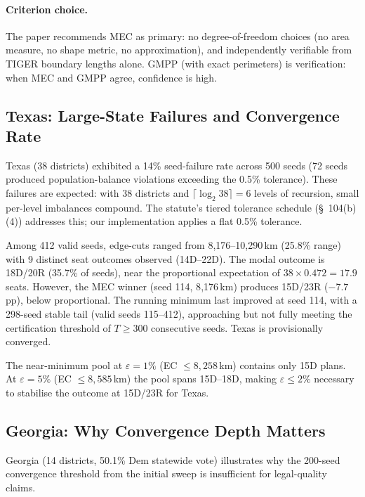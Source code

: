 \paragraph{Criterion choice.}
The paper recommends MEC as primary: no degree-of-freedom choices (no area
measure, no shape metric, no approximation), and independently verifiable
from TIGER boundary lengths alone. GMPP (with exact perimeters) is
verification: when MEC and GMPP agree, confidence is high.

\subsection{Texas: Large-State Failures and Convergence Rate}
\label{sec:eval:tx}

Texas (38 districts) exhibited a 14\% seed-failure rate across 500 seeds
(72 seeds produced population-balance violations exceeding the 0.5\%
tolerance). These failures are expected: with 38 districts and $\lceil
\log_2 38 \rceil = 6$ levels of recursion, small per-level imbalances
compound. The statute's tiered tolerance schedule (\S~104(b)(4)) addresses
this; our implementation applies a flat 0.5\% tolerance.

Among 412 valid seeds, edge-cuts ranged from 8{,}176--10{,}290\,km (25.8\%
range) with 9 distinct seat outcomes observed (14D--22D). The modal outcome is
18D/20R (35.7\% of seeds), near the proportional expectation of
$38 \times 0.472 = 17.9$ seats. However, the MEC winner (seed 114,
8{,}176\,km) produces 15D/23R ($-7.7$\,pp), below proportional.
The running minimum last improved at seed 114, with a 298-seed stable tail
(valid seeds 115--412), approaching but not fully meeting the certification
threshold of $T \geq 300$ consecutive seeds. Texas is provisionally converged.

The near-minimum pool at $\varepsilon = 1\%$ (EC $\leq 8{,}258$\,km) contains
only 15D plans. At $\varepsilon = 5\%$ (EC $\leq 8{,}585$\,km) the pool spans
15D--18D, making $\varepsilon \leq 2\%$ necessary to stabilise the outcome at
15D/23R for Texas.

\subsection{Georgia: Why Convergence Depth Matters}
\label{sec:eval:ga}

Georgia (14 districts, 50.1\% Dem statewide vote) illustrates why the 200-seed
convergence threshold from the initial sweep is insufficient for legal-quality
claims.

